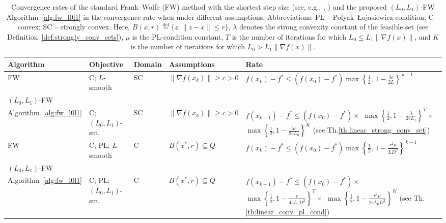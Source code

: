 \documentclass[runningheads]{llncs}
\begin{document}
	\begin{table}[ht]
		\centering
		\caption{Convergence rates of the standard Frank–Wolfe (FW) method with the shortest step size (see, e.g., \cite{braun2022conditional}, \cite{levitin1966constrained}) and the proposed $(L_0,L_1)$-FW Algorithm~\ref{alg:fw_l0l1} in the convergence rate when under different assumptions. 
			Abbreviations: PL – Polyak–Łojasiewicz condition; C – convex; SC – strongly convex. 
			Here, $B(x,r) \overset{\text{def}}{=} \{ z: \| z - x \| \leq r \}$, $\lambda$ denotes the strong convexity constant of the feasible set (see Definition~\ref{def:strongly_conv_sets}), $\mu$ is the PL-condition constant, $T$ is the number of iterations for which $L_0 \leq L_1 \| \nabla f(x) \|$, and $K$ is the number of iterations for which $L_0 > L_1 \| \nabla f(x) \|$.}
		\label{tab:fw_convergence_summary}
		\medskip
		\begin{tabular}{|l|l|l|l|p{6cm}|}
			\hline
			\textbf{Algorithm} & \textbf{Objective} & \textbf{Domain} & \textbf{Assumptions} & \textbf{Rate} \\ \hline
			
			FW & C; $L$-smooth & SC & $\|\nabla f(x_k)\|\ge c > 0$ &
			{\scriptsize $f(x_k)-f^\ast \le (f(x_0)-f^\ast)
				\max\!\left\{\frac{1}{2},\,1-\frac{\lambda c}{2L}\right\}^{\,k-1}$} 
			\\ \hline
			
			$(L_0, L_1)$-FW \\ Algorithm~\ref{alg:fw_l0l1} & C; $(L_0,L_1)$-sm. & SC & $\|\nabla f(x_k)\|\ge c > 0$ &
			\parbox[t]{6cm}{\scriptsize
				$f(x_{k+1}) - f^* \le (f(x_0) - f^*) \times$ \\
				$\max\!\left\{ \frac{1}{2}, 1 - \frac{\lambda}{2 e L_1} \right\}^T \times$ \\
				$\max\!\left\{ \frac{1}{2}, 1 - \frac{\lambda c}{2 e L_0} \right\}^K$  (see Th.\ref{th:linear_strong_conv_set})
			}
			\\ \hline
			
			FW & C; PL; $L$-smooth & C & $B(x^\ast,r)\subseteq Q$ &
			{\scriptsize $f(x_k)-f^\ast \le (f(x_0)-f^\ast)
				\max\!\left\{\frac{1}{2},\, 1-\frac{r^2\mu}{LD^2}\right\}^{\,k-1}$}
			\\ \hline
			
			$(L_0,L_1)$-FW \\ Algorithm~\ref{alg:fw_l0l1} & C; PL; $(L_0,L_1)$-sm. & C & $B(x^\ast,r)\subseteq Q$ &
			\parbox[t]{6cm}{\scriptsize
				$f(x_{k+1}) - f^* \le (f(x_0) - f^*) \times$ \\
				$\max\!\left\{ \frac{1}{2}, 1 - \frac{r}{4 e L_1 D^2} \right\}^T \times$ \\
				$\max\!\left\{ \frac{1}{2}, 1 - \frac{r^2 \mu}{2 e L_0 D^2} \right\}^K$ (see Th.\ref{th:linear_conv_pl_cond})
			}
			\\ \hline
			

\end{tabular}
\end{table}
\end{document}
